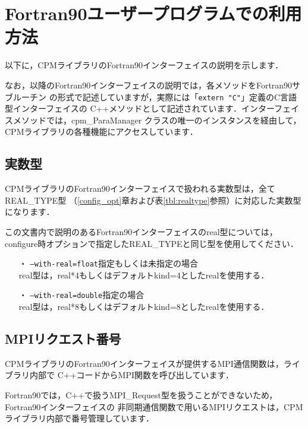 \section{Fortran90ユーザープログラムでの利用方法}
\label{use_f90}
以下に，CPMライブラリのFortran90インターフェイスの説明を示します．

なお，以降のFortran90インターフェイスの説明では，各メソッドをFortran90サブルーチン
の形式で記述していますが，実際には「{\tt extern "C"}」定義のC言語型インターフェイスの
C++メソッドとして記述されています．インターフェイスメソッドでは，cpm\_ParaManager
クラスの唯一のインスタンスを経由して，CPMライブラリの各種機能にアクセスしています．


\subsection{実数型}
\label{realtypeF}
CPMライブラリのFortran90インターフェイスで扱われる実数型は，全てREAL\_TYPE型
（\ref{config_opt}章および表\ref{tbl:realtype}参照）に対応した実数型になります．

この文書内で説明のあるFortran90インターフェイスのreal型については，
configure時オプションで指定したREAL\_TYPEと同じ型を使用してください．\\

\begin{spacing}{0.8}
\begin{itemize}
\item[・] {{\tt --with-real=float}指定もしくは未指定の場合}\\
real型は，real*4もしくはデフォルトkind=4としたrealを使用する．\\
\item[・] {{\tt --with-real=double}指定の場合}\\
real型は，real*8もしくはデフォルトkind=8としたrealを使用する．\\
\end{itemize}
\end{spacing}


\subsection{MPIリクエスト番号}
\label{reqNoF}
CPMライブラリのFortran90インターフェイスが提供するMPI通信関数は，ライブラリ内部で
C++コードからMPI関数を呼び出しています．

Fortran90では，C++で扱うMPI\_Request型を扱うことができないため，Fortran90インターフェイスの
非同期通信関数で用いるMPIリクエストは，CPMライブラリ内部で番号管理しています．


